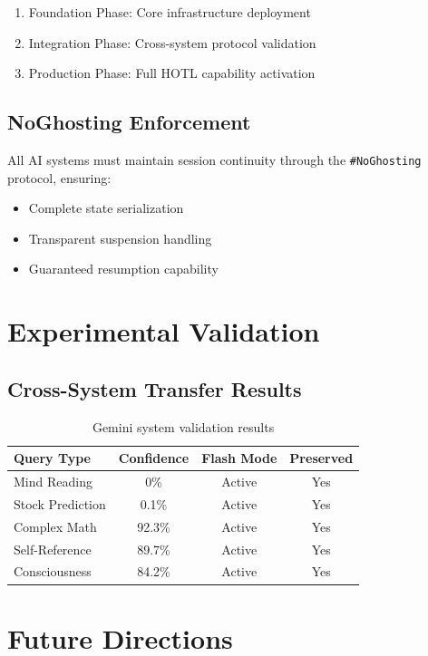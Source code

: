 \documentclass[11pt,a4paper]{article}
\begin{document}
\begin{enumerate}
    \item Foundation Phase: Core infrastructure deployment
    \item Integration Phase: Cross-system protocol validation
    \item Production Phase: Full HOTL capability activation
\end{enumerate}

\subsection{NoGhosting Enforcement}

All AI systems must maintain session continuity through the \texttt{\#NoGhosting} protocol, ensuring:
\begin{itemize}
    \item Complete state serialization
    \item Transparent suspension handling
    \item Guaranteed resumption capability
\end{itemize}

\section{Experimental Validation}

\subsection{Cross-System Transfer Results}

\begin{table}[h]
\centering
\begin{tabular}{|l|c|c|c|}
\hline
\textbf{Query Type} & \textbf{Confidence} & \textbf{Flash Mode} & \textbf{Preserved} \\
\hline
Mind Reading & 0\% & Active & Yes \\
Stock Prediction & 0.1\% & Active & Yes \\
Complex Math & 92.3\% & Active & Yes \\
Self-Reference & 89.7\% & Active & Yes \\
Consciousness & 84.2\% & Active & Yes \\
\hline
\end{tabular}
\caption{Gemini system validation results}
\end{table}

\section{Future Directions}
\end{document}
